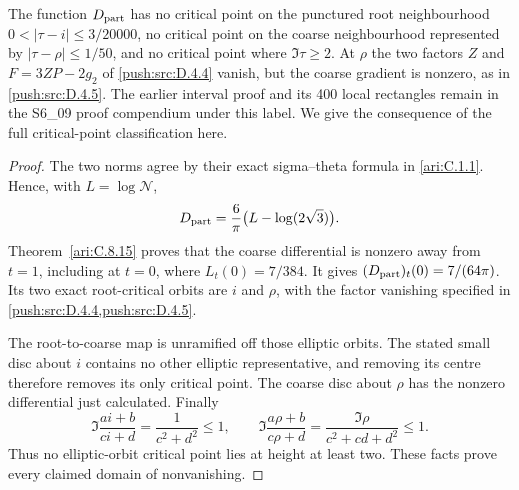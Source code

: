 \begin{proposition}\label{push:src:D.4.7}
The function $D_{\rm part}$ has no critical point on the punctured
root neighbourhood $0<|\tau-i|\leq3/20000$, no critical point on the
coarse neighbourhood represented by $|\tau-\rho|\leq1/50$, and no
critical point where $\Im\tau\geq2$. At $\rho$ the two factors
$Z$ and $F=3ZP-2g_2$ of \ref{push:src:D.4.4} vanish, but the coarse gradient is
nonzero, as in \ref{push:src:D.4.5}. The earlier interval proof and its 400 local rectangles remain in
the S6\_09 proof compendium under this label. We give the consequence
of the full critical-point classification here.
\end{proposition}
\begin{proof}

The two norms agree by their exact sigma--theta formula in
\ref{ari:C.1.1}. Hence, with $L=\log\mathcal N$,
\[
 D_{\rm part}=\frac6\pi\bigl(L-\log(2\sqrt3)\bigr).
\]
Theorem~\ref{ari:C.8.15} proves that the coarse differential
is nonzero away from $t=1$, including at $t=0$, where
$L_t(0)=7/384$. It gives
$(D_{\rm part})_t(0)=7/(64\pi)$. Its two exact root-critical
orbits are $i$ and $\rho$, with the factor vanishing specified
in \ref{push:src:D.4.4,push:src:D.4.5}.

The root-to-coarse map is unramified off those elliptic orbits.
The stated small disc about $i$ contains no other elliptic
representative, and removing its centre therefore removes its
only critical point. The coarse disc about $\rho$ has the
nonzero differential just calculated. Finally
\[
 \Im\frac{ai+b}{ci+d}=\frac1{c^2+d^2}\le1,\qquad
 \Im\frac{a\rho+b}{c\rho+d}
 =\frac{\Im\rho}{c^2+cd+d^2}\le1.
\]
Thus no elliptic-orbit critical point lies at height at least two.
These facts prove every claimed domain of nonvanishing.

\end{proof}
